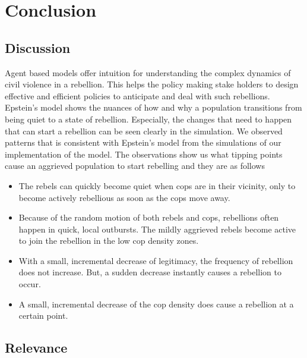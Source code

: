 \documentclass[a4paper,11pt]{article}
\begin{document}
\section{Conclusion}
\subsection{Discussion}

Agent based models offer intuition for understanding the complex dynamics of civil violence in a rebellion. This helps the policy making stake holders to design effective and efficient policies to anticipate and deal with such rebellions. Epstein's model shows the nuances of how and why a population transitions from being quiet to a state of rebellion\cite{epstein2002modeling}. Especially, the changes that need to happen that can start a rebellion can be seen clearly in the simulation. We observed patterns that is consistent with Epstein's model \cite{epstein2002modeling} from the simulations of our implementation of the model. The observations show us what tipping points cause an aggrieved population to start rebelling and they are as follows
\begin{itemize}
    \item The rebels can quickly become quiet when cops are in their vicinity, only to become actively rebellious as soon as the cops move away.
    \item Because of the random motion of both rebels and cops, rebellions often happen in quick, local outbursts. The mildly aggrieved rebels become active to join the rebellion in the low cop density zones.
    \item With a small, incremental decrease of legitimacy, the frequency of rebellion does not increase. But, a sudden decrease instantly causes a rebellion to occur.
    \item A small, incremental decrease of the cop density does cause a rebellion at a certain point.
\end{itemize}


\subsection{Relevance}
\end{document}
